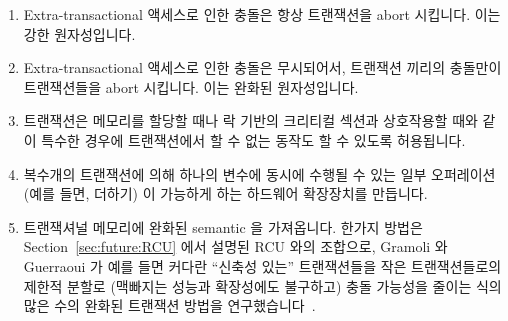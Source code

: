 \begin{enumerate}
\item	Extra-transactional 액세스로 인한 충돌은 항상 트랜잭션을 abort
	시킵니다.
	이는 강한 원자성입니다.
\item	Extra-transactional 액세스로 인한 충돌은 무시되어서, 트랜잭션 끼리의
	충돌만이 트랜잭션들을 abort 시킵니다.
	이는 완화된 원자성입니다.
\item	트랜잭션은 메모리를 할당할 때나 락 기반의 크리티컬 섹션과 상호작용할
	때와 같이 특수한 경우에 트랜잭션에서 할 수 없는 동작도 할 수 있도록
	허용됩니다.
\item	복수개의 트랜잭션에 의해 하나의 변수에 동시에 수행될 수 있는 일부
	오퍼레이션 (예를 들면, 더하기) 이 가능하게 하는 하드웨어 확장장치를
	만듭니다.
\item	트랜잭셔널 메모리에 완화된 semantic 을 가져옵니다.
	한가지 방법은 Section~\ref{sec:future:RCU} 에서 설명된 RCU 와의
	조합으로, Gramoli 와 Guerraoui 가 예를 들면 커다란 ``신축성 있는''
	트랜잭션들을 작은 트랜잭션들로의 제한적 분할로 (맥빠지는 성능과
	확장성에도 불구하고) 충돌 가능성을 줄이는 식의 많은 수의 완화된
	트랜잭션 방법을 연구했습니다~\cite{Gramoli:2014:DTP:2541883.2541900}.

\end{enumerate}

